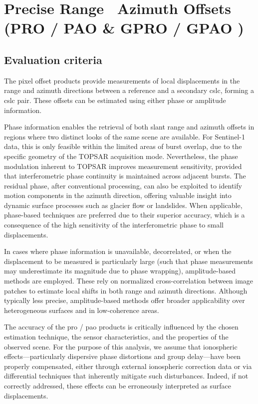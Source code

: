 \section{Precise Range \ Azimuth Offsets (PRO / PAO \& GPRO / GPAO )}
\label{sec:pro_pao}

\subsection{Evaluation criteria}
\label{sec:pro_pao_criteria}

The pixel offset products provide measurements of local displacements in the range and azimuth directions between a reference and a secondary \acs{cslc}, forming a \acs{cslc} pair. These offsets can be estimated using either phase or amplitude information.

Phase information enables the retrieval of both slant range and azimuth offsets in regions where two distinct looks of the same scene are available. For Sentinel-1 data, this is only feasible within the limited areas of burst overlap, due to the specific geometry of the TOPSAR acquisition mode. Nevertheless, the phase modulation inherent to TOPSAR improves measurement sensitivity, provided that interferometric phase continuity is maintained across adjacent bursts. The residual phase, after conventional processing, can also be exploited to identify motion components in the azimuth direction, offering valuable insight into dynamic surface processes such as glacier flow or landslides. When applicable, phase-based techniques are preferred due to their superior accuracy, which is a consequence of the high sensitivity of the interferometric phase to small displacements.

In cases where phase information is unavailable, decorrelated, or when the displacement to be measured is particularly large (such that phase measurements may underestimate its magnitude due to phase wrapping), amplitude-based methods are employed. These rely on normalized cross-correlation between image patches to estimate local shifts in both range and azimuth directions. Although typically less precise, amplitude-based methods offer broader applicability over heterogeneous surfaces and in low-coherence areas.

The accuracy of the \acs{pro} / \acs{pao} products is critically influenced by the chosen estimation technique, the sensor characteristics, and the properties of the observed scene. For the purpose of this analysis, we assume that ionospheric effects—particularly dispersive phase distortions and group delay—have been properly compensated, either through external ionospheric correction data or via differential techniques that inherently mitigate such disturbances. Indeed, if not correctly addressed, these effects can be erroneously interpreted as surface displacements.

